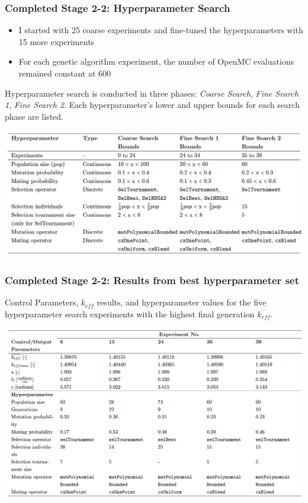 \begin{frame}
    \frametitle{Completed Stage 2-2: Hyperparameter Search}
    \begin{itemize}
        \item I started with 25 coarse experiments and fine-tuned the hyperparameters
        with 15 more experiments
        \item For each genetic algorithm experiment, the number 
        of OpenMC evaluations remained constant at 600
    \end{itemize}
    \begin{table}
        \caption{Hyperparameter search is conducted in three phases: \textit{Coarse Search}, 
    \textit{Fine Search 1}, \textit{Fine Search 2}. Each hyperparameter's lower and
    upper bounds for each search phase are listed.}
        \includegraphics[width=0.8\linewidth]{figures/hyperparameter-search.png} 
    \end{table}
\end{frame}


\begin{frame}
    \frametitle{Completed Stage 2-2: Results from best hyperparameter set}
    \begin{table}
        \caption{Control Parameters, $k_{eff}$ results, and hyperparameter values for 
        the five hyperparameter search experiments with the highest final generation 
        $\overline{k_{eff}}$.}
        \includegraphics[width=0.85\linewidth]{figures/rollo-demo-best.png} 
    \end{table}
\end{frame}

